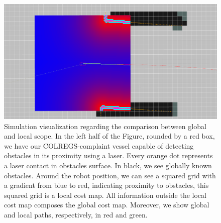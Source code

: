         \begin{figure}[H]
            \centering
            \includegraphics[scale=0.35]{figs/Chap4/reduced_localCostMap2.png}
            \caption{Simulation visualization regarding the comparison between global and local scope. In the left half of the Figure, rounded by a red box, we have our \ac{COLREGS}-complaint vessel capable of detecting obstacles in its proximity using a laser. Every orange dot represents a laser contact in obstacles surface. In black, we see globally known obstacles.  Around the robot position, we can see a squared grid with a gradient from blue to red, indicating proximity to obstacles, this squared grid is a local cost map. All information outside the local cost map composes the global cost map. Moreover, we show global and local paths, respectively, in red and green.}
            \label{fig:costmaps}
        \end{figure}
        
